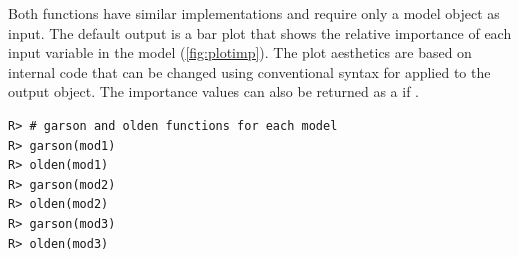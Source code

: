 \documentclass[article,shortnames]{jss}\usepackage[]{graphicx}\usepackage[]{color}
\makeatletter
\newenvironment{kframe}{%
 \def\at@end@of@kframe{}%
 \ifinner\ifhmode%
  \def\at@end@of@kframe{\end{minipage}}%
  \begin{minipage}{\columnwidth}%
 \fi\fi%
 \def\FrameCommand##1{\hskip\@totalleftmargin \hskip-\fboxsep
 \colorbox{shadecolor}{##1}\hskip-\fboxsep
     \hskip-\linewidth \hskip-\@totalleftmargin \hskip\columnwidth}%
 \MakeFramed {\advance\hsize-\width
   \@totalleftmargin\z@ \linewidth\hsize
   \@setminipage}}%
 {\par\unskip\endMakeFramed%
 \at@end@of@kframe}
\newenvironment{knitrout}{}{} %
\makeatother
\begin{document}
Both functions have similar implementations and require only a model object as input.  The default output is a  bar plot \citep[i.e., ,][]{Wickham09} that shows the relative importance of each input variable in the model (\cref{fig:plotimp}).  The plot aesthetics are based on internal code that can be changed using conventional syntax for  applied to the output object.  The importance values can also be returned as a  if .  

\begin{knitrout}
\color{fgcolor}\begin{kframe}
\begin{verbatim}
R> # garson and olden functions for each model
R> garson(mod1)
R> olden(mod1)
R> garson(mod2)
R> olden(mod2)
R> garson(mod3)
R> olden(mod3)
\end{verbatim}
\end{kframe}
\end{knitrout}
\end{document}
